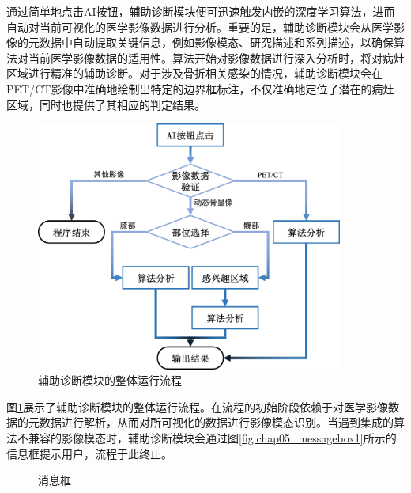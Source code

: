 通过简单地点击AI按钮，辅助诊断模块便可迅速触发内嵌的深度学习算法，进而自动对当前可视化的医学影像数据进行分析。重要的是，辅助诊断模块会从医学影像的元数据中自动提取关键信息，例如影像模态、研究描述和系列描述，以确保算法对当前医学影像数据的适用性。算法开始对影像数据进行深入分析时，将对病灶区域进行精准的辅助诊断。对于涉及骨折相关感染的情况，辅助诊断模块会在PET/CT影像中准确地绘制出特定的边界框标注，不仅准确地定位了潜在的病灶区域，同时也提供了其相应的判定结果。

\begin{figure}[htbp]
    \centering
    \includegraphics[width=0.9\textwidth]{figures/chap05_diagnose.png}
    \caption{辅助诊断模块的整体运行流程}
    \label{fig:chap05_diagnose}
\end{figure}

图\ref{fig:chap05_diagnose}展示了辅助诊断模块的整体运行流程。在流程的初始阶段依赖于对医学影像数据的元数据进行解析，从而对所可视化的数据进行影像模态识别。当遇到集成的算法不兼容的影像模态时，辅助诊断模块会通过图\ref{fig:chap05_messagebox1}所示的信息框提示用户，流程于此终止。

\begin{figure}[htbp]
    \centering
    \label{fig:chap05_messagebox}
    \caption{消息框}
\end{figure}

